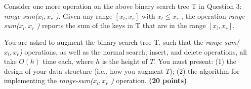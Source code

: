 \documentclass{article}
\begin{document}
\section{}

 Consider one more operation on the above binary search tree T in
 Question 3: \emph{range-sum($x_l ,x_r$ )}. Given any range $[x_l ,x_r
 ]$ with $x_l \le x_r$ , the operation \emph{range-sum($x_l ,x_r$ )}
 reports the sum of the keys in T that are in the range $[x_l ,x_r ]$.

You are asked to augment the binary search tree T, such that the
\emph{range-sum($x_l ,x_r $)} operations, as well as the normal search,
  insert, and delete operations, all take $O(h)$ time each, where $h$
 is the height of $T$.
You must present: (1) the design of your data structure (i.e., how you
augment $T$); (2) the algorithm for implementing the
\emph{range-sum($x_l ,x_r$ )} operation. {\bf (20 points)  }
\end{document}
